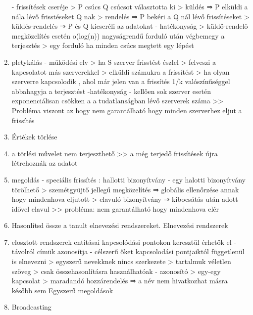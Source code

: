 \documentclass[twoside, a4paper, 12pt]{article}
\begin{document}
\begin{enumerate}
                - frissítések cseréje
                > P csúcs Q csúcsot választotta ki
                > küldés   ⇒ P elküldi a nála lévő frisstéseket Q nak
                > rendelés ⇒ P bekéri a Q nál lévő frissítéseket
                > küldés-rendelés ⇒ P és Q kicseréli az adatokat
                - hatékonyság
                > küldő-rendelő megközelítés esetén o(log(n)) nagyságrendű forduló után végbemegy a terjesztés
                > egy forduló ha minden csúcs megtett egy lépést
            \item pletykálás
                - működési elv
                > ha S szerver frisstést észlel
                > felveszi a kapcsolatot más szerverekkel 
                > elküldi számukra a frissítést
                > ha olyan szerverre kapcsolodik , ahol már jelen van a frissítés 1/k valószínűséggel abbahagyja a terjesztést
                -hatékonyság
                - kellően sok szerver esetén exponenciálisan csökken a a tudatlanságban lévő szerverek száma
                >> Probléma viszont az hogy nem garantálható hogy minden szerverhez eljut a frissítés 
            \item Értékek törlése
            \item a törlési művelet nem terjeszthető
                >> a még terjedő frissítések újra létrehoznák az adatot
            \item megoldás
                - speciális frissítés : hallotti bizonyítvány
                - egy halotti bizonyítvány törölhető
                > szemétgyüjtő jellegű megközelítés ⇒ globális ellenőrzése annak hogy mindenhova eljutott
                > elavuló bizonyítvány ⇒ kibocsátás után adott idővel elavul >> probléma: nem garantálható hogy mindenhova elér
            \item  Hasonlítsd össze a tanult elnevezési rendszereket.
                Elnevezési rendszerek
            \item elosztott rendszerek entitásai kapcsolódási pontokon keresztül érhetők el
                - távolról címük azonosítja
                - célszerű őket kapcsolodási pontjaiktól függetlenül is elnevezni
                > egyszerű nevekknek nincs szerkezete
                > tartalmuk véletlen szöveg
                > csak összehasonlításra használhatóak
                - azonosító
                > egy-egy kapcsolat
                > maradandó hozzárendelés
                ⇒ a név nem hivatkozhat másra később sem
                Egyszerű megoldások 
            \item Broadcasting

\end{enumerate}
\end{document}
